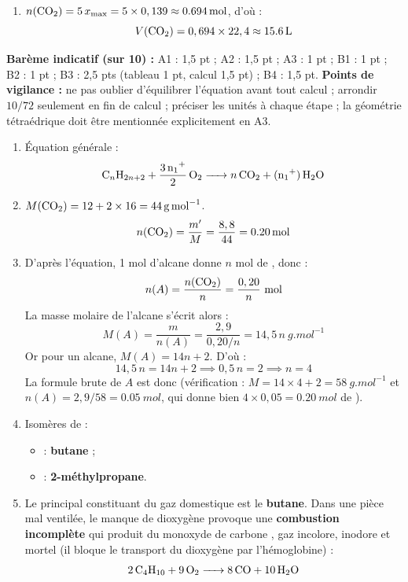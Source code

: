 \documentclass[11pt]{article}
\begin{document}
\begin{corrige}
\begin{enumerate}
\[ V(\ce{O2}) = 1,11 \times 22,4 \approx \SI{24,9}{L} \]
\item $n(\ce{CO2}) = 5\,x_{\max} = 5 \times 0,139 \approx \SI{0,694}{mol}$, d'où :
\[ V(\ce{CO2}) = 0,694 \times 22,4 \approx \SI{15,6}{L} \]
\end{enumerate}
\textbf{Barème indicatif (sur 10) :} A1 : 1,5 pt ; A2 : 1,5 pt ; A3 : 1 pt ; B1 : 1 pt ; B2 : 1 pt ; B3 : 2,5 pts (tableau 1 pt, calcul 1,5 pt) ; B4 : 1,5 pt.
\textbf{Points de vigilance :} ne pas oublier d'équilibrer l'équation avant tout calcul ; arrondir $10/72$ seulement en fin de calcul ; préciser les unités à chaque étape ; la géométrie tétraédrique doit être mentionnée explicitement en A3.
\end{corrige}

\begin{corrige}
\begin{enumerate}
\item Équation générale :
\[ \ce{C_nH_{2n+2} + \frac{3n+1}{2} O2 -> n CO2 + (n+1) H2O} \]
\item $M(\ce{CO2}) = 12 + 2\times16 = \SI{44}{g.mol^{-1}}$.
\[ n(\ce{CO2}) = \frac{m'}{M} = \frac{8,8}{44} = \SI{0,20}{mol} \]
\item D'après l'équation, 1 mol d'alcane donne $n$ mol de , donc :
\[ n(A) = \frac{n(\ce{CO2})}{n} = \frac{0,20}{n} \ \text{mol} \]
La masse molaire de l'alcane s'écrit alors :
\[ M(A) = \frac{m}{n(A)} = \frac{2,9}{0,20/n} = 14,5\,n \ \si{g.mol^{-1}} \]
Or pour un alcane, $M(A) = 14n + 2$. D'où :
\[ 14,5\,n = 14n + 2 \implies 0,5\,n = 2 \implies n = 4 \]
La formule brute de $A$ est donc  (vérification : $M = 14\times4 + 2 = \SI{58}{g.mol^{-1}}$ et $n(A) = 2,9/58 = \SI{0,05}{mol}$, qui donne bien $4\times0,05 = \SI{0,20}{mol}$ de ).
\item Isomères de  :
\begin{itemize}
\item {} : \textbf{butane} ;
\item {} : \textbf{2-méthylpropane}.
\end{itemize}
\item Le principal constituant du gaz domestique est le \textbf{butane}. Dans une pièce mal ventilée, le manque de dioxygène provoque une \textbf{combustion incomplète} qui produit du monoxyde de carbone , gaz incolore, inodore et mortel (il bloque le transport du dioxygène par l'hémoglobine) :
\[ \ce{2 C4H10 + 9 O2 -> 8 CO + 10 H2O} \]

\end{enumerate}
\end{corrige}
\end{document}
